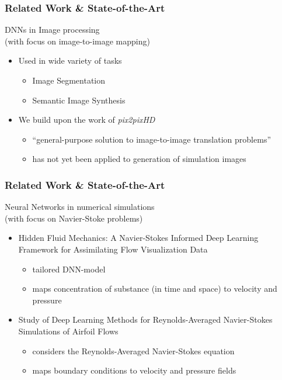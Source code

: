 \documentclass[18pt]{beamer}
\begin{document}
\begin{frame}[t]
  \frametitle{Related Work \& State-of-the-Art}
  DNNs in Image processing\\
  {\footnotesize (with focus on image-to-image mapping)}
  \begin{itemize}
  \item Used in wide variety of tasks
    \begin{itemize}
    \item Image Segmentation
    \item Semantic Image Synthesis
    \end{itemize}
  \item We build upon the work of \textit{pix2pixHD}\footnotemark
    \begin{itemize}
    \item ``general-purpose solution to image-to-image translation problems''
    \item has not yet been applied to generation of simulation images
    \end{itemize}
  \end{itemize}
\end{frame}


\begin{frame}[t]
  \frametitle{Related Work \& State-of-the-Art}  
  Neural Networks in numerical simulations\\
  {\footnotesize (with focus on Navier-Stoke problems)}
  \begin{itemize}

  \item Hidden Fluid Mechanics: A Navier-Stokes Informed Deep Learning Framework for Assimilating Flow Visualization Data\footnotemark
    \begin{itemize}
    \item tailored DNN-model
    \item maps concentration of substance (in time and space) to velocity and pressure
    \end{itemize}
    
    \item Study of Deep Learning Methods for Reynolds-Averaged Navier-Stokes Simulations of Airfoil Flows\footnotemark
    \begin{itemize}
    \item considers the Reynolds-Averaged Navier-Stokes equation
    \item maps boundary conditions to velocity and pressure fields
    \end{itemize}
    
  \end{itemize}
\end{frame}
\end{document}
